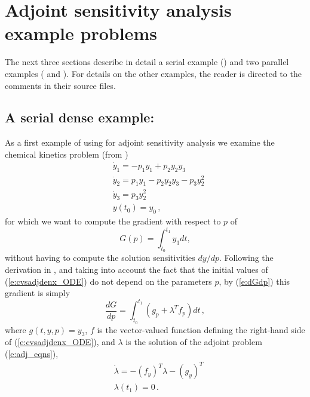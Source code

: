 \section{Adjoint sensitivity analysis example problems}\label{s:adj_examples}

The next three sections describe in detail a serial example () and
two parallel examples ( and ). For details on the other
examples, the reader is directed to the comments in their source files.

\subsection{A serial dense example: }\label{ss:cvsadjdenx}

As a first example of using {\cvodes} for adjoint sensitivity analysis
we examine the chemical kinetics problem (from ) 
\begin{equation}\label{e:cvsadjdenx_ODE}
  \begin{split}
    &{\dot y}_1 = -p_1 y_1 + p_2 y_2 y_3   \\
    &{\dot y}_2 =  p_1 y_1 - p_2 y_2 y_3 - p_3 y_2^2 \\
    &{\dot y}_3 =  p_3 y_2^2 \\
    &y(t_0) = y_0 \, ,
  \end{split}
\end{equation}
for which we want to compute the gradient with respect to $p$ of 
\begin{equation}\label{e:cvsadjdenx_G}
  G(p) = \int_{t_0}^{t_1}  y_3  dt ,
\end{equation}
without having to compute the solution sensitivities ${dy}/{dp}$.
Following the derivation in , and taking into account
the fact that the initial values of (\ref{e:cvsadjdenx_ODE}) do not depend on 
the parameters $p$, by (\ref{e:dGdp}) this gradient is simply
\begin{equation}\label{e:cvsadjdenx_dGdp}
\frac{dG}{dp} = \int_{t_0}^{t_1} 
\left( g_p + \lambda^T f_p \right) dt \, ,
\end{equation}
where $g(t,y,p) = y_3$, $f$ is the vector-valued function 
defining the right-hand side of (\ref{e:cvsadjdenx_ODE}), and $\lambda$ is 
the solution of the adjoint problem (\ref{e:adj_eqns}),
\begin{equation}\label{e:cvsadjdenx_ADJ}
  \begin{split}
    &{\dot\lambda} = - (f_y)^T  \lambda - (g_y)^T \\
    &\lambda(t_1) = 0 \, .
  \end{split}
\end{equation}

